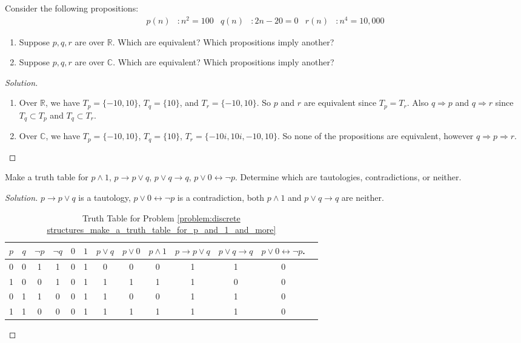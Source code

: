 \documentclass[crop=false,class=book]{standalone}
\begin{document}
\begin{problem}
Consider the following propositions:
\begin{align*}
    p(n)&:n^{2}=100 & q(n)&:2n-20=0 & r(n)&:n^{4}=10,000
\end{align*}
\begin{enumerate}
    \item Suppose $p,q,r$ are over $\mathbb{R}$. Which are equivalent? Which propositions imply another?
    \item Suppose $p,q,r$ are over $\mathbb{C}$. Which are equivalent? Which propositions imply another?
\end{enumerate}
\end{problem}
\begin{proof}[Solution]
\vspace{-\topsep}
\
\begin{enumerate}
    \item Over $\mathbb{R}$, we have $T_{p} = \{-10,10\}$, $T_{q} = \{10\}$, and $T_{r} = \{-10,10\}$. So $p$ and $r$ are equivalent since $T_{p} = T_{r}$. Also $q\Rightarrow p$ and $q\Rightarrow r$ since $T_{q} \subset T_{p}$ and $T_{q}\subset T_{r}$.
    \item Over $\mathbb{C}$, we have $T_{p} = \{-10,10\}$, $T_{q} = \{10\}$, $T_{r} = \{-10i,10i,-10,10\}$. So none of the propositions are equivalent, however $q\Rightarrow p \Rightarrow r$.
\end{enumerate}
\end{proof}
\begin{problem}
\label{problem:discrete structures_make_a_truth_table_for_p_and_1_and_more}
Make a truth table for $p\land 1$, $p\rightarrow p\lor q$, $p\lor q \rightarrow q$, $p\lor 0 \leftrightarrow \neg p$. Determine which are tautologies, contradictions, or neither.
\end{problem}
\begin{proof}[Solution]
$p\rightarrow p\lor q$ is a tautology, $p\lor 0 \leftrightarrow \neg p$ is a contradiction, both $p\land 1$ and $p\lor q \rightarrow q$ are neither. 
\begin{table}[H]
    \centering
    \begin{tabular}{c c c c c c c c c c c c c} 
         \hline 
         $p$ & $q$ & $\neg p$ & $\neg q$ & $0$ & $1$ & $p\lor q$ & $p \lor 0$ & $p\land 1$ & $p\rightarrow p\lor q$ & $p\lor q \rightarrow q$ & $p\lor 0 \leftrightarrow \neg p$.\\ [0.5ex] 
         \hline
         0 & 0 & 1 & 1 & 0 & 1 & 0 & 0 & 0 & 1 & 1 & 0 \\
         1 & 0 & 0 & 1 & 0 & 1 & 1 & 1 & 1 & 1 & 0 & 0 \\
         0 & 1 & 1 & 0 & 0 & 1 & 1 & 0 & 0 & 1 & 1 & 0 \\
         1 & 1 & 0 & 0 & 0 & 1 & 1 & 1 & 1 & 1 & 1 & 0 \\
         \hline
    \end{tabular}
    \caption{Truth Table for Problem \ref{problem:discrete structures_make_a_truth_table_for_p_and_1_and_more}}
\end{table}
\end{proof}
\end{document}
